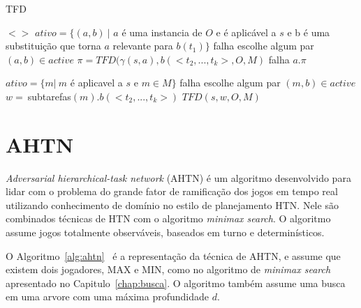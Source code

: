 \begin{algorithm}
	\caption{TFD}
	\label{alg:tfd}
	\begin{algorithmic}[1]		
				\State	\Return $<>$
			\EndIf
				\State $ativo = \{(a, b)~ |$ $a$ é uma instancia de $O$ e é aplicável a $s$ e b é uma substituição que torna $a$ relevante para $b(t_{1})\}$
					\State \Return falha
				\EndIf
				\State escolhe algum par $(a, b) \in active$
				\State $\pi = TFD(\gamma(s, a), b(<t_{2}, ..., t_{k}>, O, M)$
					\State \Return falha
				\Else 
					\State \Return $a . \pi$
			\EndIf
			
				\State $ativo = \{m |~ m$ é aplicavel a $s$ e $m \in M\}$
					\State \Return falha
				\EndIf
				\State escolhe algum par $(m, b) \in active$
				\State $w =~ $subtarefas$(m).b(<t_{2}, ..., t_{k}>)$
				\State \Return $TFD(s, w, O, M)$
				\EndIf
		\EndFunction
	\end{algorithmic}
\end{algorithm}

\section{AHTN} 

\textit{Adversarial hierarchical-task network} (AHTN) é um algoritmo desenvolvido para lidar com o problema do grande fator de ramificação dos jogos em tempo real~\cite{ontanon2015adversarial} utilizando conhecimento de domínio no estilo de planejamento HTN. 
Nele são combinados técnicas de HTN com o algoritmo \textit{minimax search}. 
O algoritmo assume jogos totalmente observáveis, baseados em turno e determinísticos. 

O Algoritmo~\ref{alg:ahtn}~\cite{ontanon2015adversarial} é a representação da técnica de AHTN, e assume que existem dois jogadores, MAX e MIN, como no algoritmo de \textit{minimax search} apresentado no Capitulo~\ref{chap:busca}. 
O algoritmo também assume uma busca em uma arvore com uma máxima profundidade $d$.


